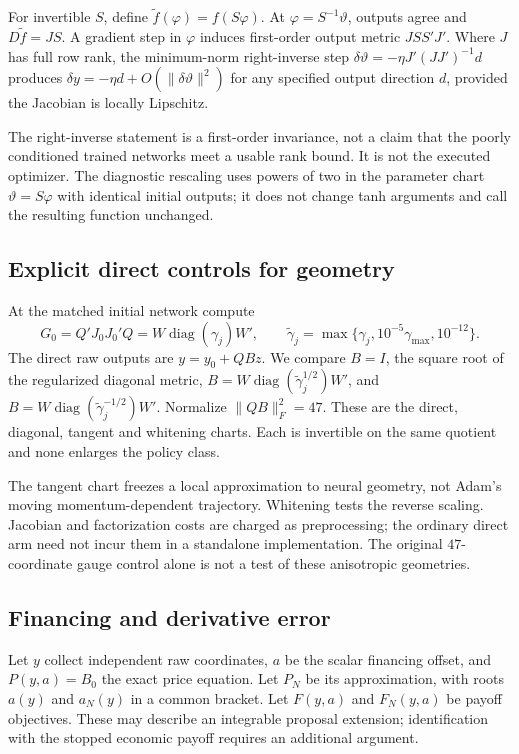\begin{proposition}\label{prop:r24charts}
For invertible $S$, define $\widetilde f(\varphi)=f(S\varphi)$. At $\varphi=S^{-1}\vartheta$, outputs agree and $D\widetilde f=JS$. A gradient step in $\varphi$ induces first-order output metric $JSS'J'$. Where $J$ has full row rank, the minimum-norm right-inverse step $\delta\vartheta=-\eta J'(JJ')^{-1}d$ produces $\delta y=-\eta d+O(\|\delta\vartheta\|^2)$ for any specified output direction $d$, provided the Jacobian is locally Lipschitz.
\end{proposition}
The right-inverse statement is a first-order invariance, not a claim that the poorly conditioned trained networks meet a usable rank bound. It is not the executed optimizer. The diagnostic rescaling uses powers of two in the parameter chart $\vartheta=S\varphi$ with identical initial outputs; it does not change tanh arguments and call the resulting function unchanged.

\subsection{Explicit direct controls for geometry}
At the matched initial network compute
\[
 G_0=Q'J_0J_0'Q=W\operatorname{diag}(\gamma_j)W',\qquad
 \widetilde\gamma_j=\max\{\gamma_j,10^{-5}\gamma_{\max},10^{-12}\}.
\]
The direct raw outputs are $y=y_0+QBz$. We compare $B=I$, the square root of the regularized diagonal metric, $B=W\operatorname{diag}(\widetilde\gamma_j^{1/2})W'$, and $B=W\operatorname{diag}(\widetilde\gamma_j^{-1/2})W'$. Normalize $\|QB\|_F^2=47$. These are the direct, diagonal, tangent and whitening charts. Each is invertible on the same quotient and none enlarges the policy class.

The tangent chart freezes a local approximation to neural geometry, not Adam's moving momentum-dependent trajectory. Whitening tests the reverse scaling. Jacobian and factorization costs are charged as preprocessing; the ordinary direct arm need not incur them in a standalone implementation. The original $47$-coordinate gauge control alone is not a test of these anisotropic geometries.

\subsection{Financing and derivative error}
Let $y$ collect independent raw coordinates, $a$ be the scalar financing offset, and $P(y,a)=B_0$ the exact price equation. Let $P_N$ be its approximation, with roots $a(y)$ and $a_N(y)$ in a common bracket. Let $F(y,a)$ and $F_N(y,a)$ be payoff objectives. These may describe an integrable proposal extension; identification with the stopped economic payoff requires an additional argument.

